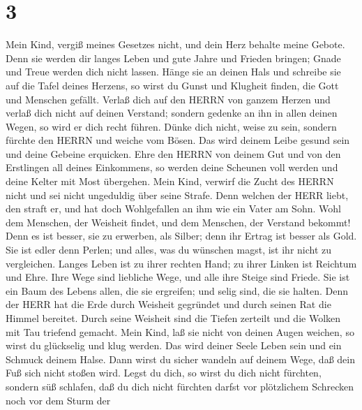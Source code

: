 \hypertarget{section-2}{%
\section{3}\label{section-2}}

 Mein Kind, vergiß meines Gesetzes nicht, und dein Herz
behalte meine Gebote.  Denn sie werden dir langes Leben und
gute Jahre und Frieden bringen;  Gnade und Treue werden dich
nicht lassen. Hänge sie an deinen Hals und schreibe sie auf die Tafel
deines Herzens,  so wirst du Gunst und Klugheit finden, die
Gott und Menschen gefällt.  Verlaß dich auf den HERRN von
ganzem Herzen und verlaß dich nicht auf deinen Verstand; 
sondern gedenke an ihn in allen deinen Wegen, so wird er dich recht
führen.  Dünke dich nicht, weise zu sein, sondern fürchte
den HERRN und weiche vom Bösen.  Das wird deinem Leibe
gesund sein und deine Gebeine erquicken.  Ehre den HERRN von
deinem Gut und von den Erstlingen all deines Einkommens, 
so werden deine Scheunen voll werden und deine Kelter mit Most
übergehen.  Mein Kind, verwirf die Zucht des HERRN nicht
und sei nicht ungeduldig über seine Strafe.  Denn welchen
der HERR liebt, den straft er, und hat doch Wohlgefallen an ihm wie ein
Vater am Sohn.  Wohl dem Menschen, der Weisheit findet, und
dem Menschen, der Verstand bekommt!  Denn es ist besser,
sie zu erwerben, als Silber; denn ihr Ertrag ist besser als Gold.
 Sie ist edler denn Perlen; und alles, was du wünschen
magst, ist ihr nicht zu vergleichen.  Langes Leben ist zu
ihrer rechten Hand; zu ihrer Linken ist Reichtum und Ehre. 
Ihre Wege sind liebliche Wege, und alle ihre Steige sind Friede.
 Sie ist ein Baum des Lebens allen, die sie ergreifen; und
selig sind, die sie halten.  Denn der HERR hat die Erde
durch Weisheit gegründet und durch seinen Rat die Himmel bereitet.
 Durch seine Weisheit sind die Tiefen zerteilt und die
Wolken mit Tau triefend gemacht.  Mein Kind, laß sie nicht
von deinen Augen weichen, so wirst du glückselig und klug werden.
 Das wird deiner Seele Leben sein und ein Schmuck deinem
Halse.  Dann wirst du sicher wandeln auf deinem Wege, daß
dein Fuß sich nicht stoßen wird.  Legst du dich, so wirst
du dich nicht fürchten, sondern süß schlafen,  daß du dich
nicht fürchten darfst vor plötzlichem Schrecken noch vor dem Sturm der
